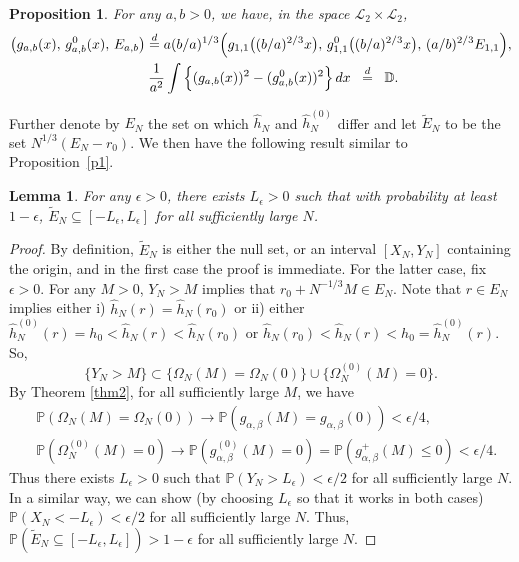 \documentclass[12pt]{amsart}
\theoremstyle{plain}
\newtheorem{lemma}[theorem]{Lemma}
\newtheorem{proposition}[theorem]{Proposition}
\theoremstyle{remark}
\numberwithin{equation}{section}
\begin{document}
\begin{proposition}\label{lem:dist}
For any \(a,b > 0\), we have, in the space $\mathcal{L}_2 \times \mathcal{L}_2$,
\begin{align*}
&\bigl(g_{a,b}(x),\, g^0_{a,b}(x),\, E_{a,b}\bigr) \stackrel{d}{=} a(b/a)^{1/3}
\Bigl(g_{1,1}\bigl((b/a)^{2/3} x\bigr),\,g^0_{1,1}\bigl((b/a)^{2/3} x\bigr),\,(a/b)^{2/3} E_{1,1}\Bigr),\\
&\hspace{3.5cm}\frac{1}{a^2} \int \Big\{ (g_{a,b}(x))^2 - (g^{0}_{a,b}(x))^2 \Big\}\, dx 
\;\;\stackrel{d}{=}\;\; \mathbb{D}.
\end{align*}
\end{proposition}

Further denote by $E_{N}$ the set on which $\hat{h}_{N}$ and $\hat{h}_{N}^{(0)}$ differ and let $\widetilde{E}_{N}$ to be the set $N^{1 / 3}\left(E_{N}-r_{0}\right)$. We then have the following result similar to Proposition~\ref{p1}.

\begin{lemma}\label{lem1}
    For any $\epsilon > 0$, there exists $L_\epsilon > 0$ such that with probability at least $1-\epsilon$, $\widetilde{E}_{N} \subseteq [-L_\epsilon,L_\epsilon]$ for all sufficiently large $N$.
\end{lemma}

\begin{proof}
By definition, $\widetilde{E}_{N}$ is either the null set, or an interval $[X_N, Y_N]$ containing the origin, and in the first case the proof is immediate. For the latter case, fix $\epsilon > 0$. 
For any $M > 0$, $Y_N > M$ implies that $r_0 + N^{-1/3}M \in E_N$. Note that $r \in E_N$ implies either i) $\hat{h}_N(r) = \hat{h}_N(r_0)$ or ii) either $\hat{h}^{(0)}_N(r) = h_0 < \hat{h}_N(r) < \hat{h}_N(r_0)$ or $\hat{h}_N(r_0) < \hat{h}_N(r) < h_0 = \hat{h}^{(0)}_N(r)$. So,
\begin{equation*}
\{Y_N > M\} \subset  \{\Omega_N(M) = \Omega_N(0)\} \cup  \{\Omega^{(0)}_N(M) = 0\}.
\end{equation*}
By Theorem \ref{thm2}, for all sufficiently large $M$, we have
\begin{align*}&\mathbb{P}(\Omega_N(M) = \Omega_N(0)) \to \mathbb{P}(g_{\alpha,\beta}(M) = g_{\alpha,\beta}(0)) < \epsilon/4, \\
&\mathbb{P}(\Omega^{(0)}_N(M) = 0) \to \mathbb{P}(g^{(0)}_{\alpha,\beta}(M) = 0) = \mathbb{P}(g^+_{\alpha,\beta}(M) \leq 0)  < \epsilon/4.\end{align*}
Thus there exists $L_\epsilon > 0$ such that $\mathbb{P}(Y_N > L_{\epsilon}) < \epsilon/2$ for all sufficiently large $N$. In a similar way, we can show (by choosing $L_\epsilon$ so that it works in both cases) $\mathbb{P}(X_N < -L_{\epsilon}) < \epsilon/2$ for all sufficiently large $N$. Thus, $\mathbb{P}(\widetilde{E}_{N} \subseteq [-L_\epsilon,L_\epsilon]) > 1-\epsilon$ for all sufficiently large $N$.
\end{proof}
\end{document}
